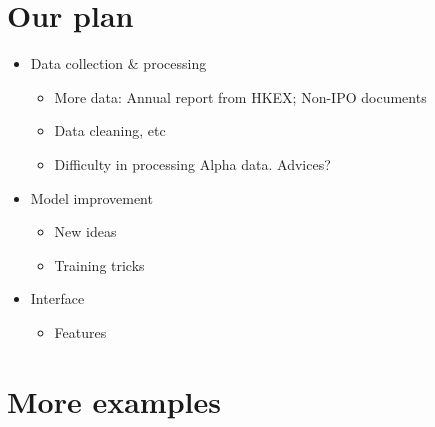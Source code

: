 \documentclass[11pt]{article}
\providecommand{\tightlist}{%
      \setlength{\itemsep}{0pt}\setlength{\parskip}{0pt}}
\begin{document}
    \section{Our plan}\label{our-plan}

\begin{itemize}
\tightlist
\item
  Data collection \& processing

  \begin{itemize}
  \tightlist
  \item
    More data: Annual report from HKEX; Non-IPO documents
  \item
    Data cleaning, etc
  \item
    Difficulty in processing Alpha data. Advices?
  \end{itemize}
\item
  Model improvement

  \begin{itemize}
  \tightlist
  \item
    New ideas
  \item
    Training tricks
  \end{itemize}
\item
  Interface

  \begin{itemize}
  \tightlist
  \item
    Features
  \end{itemize}
\end{itemize}

    \section{More examples}\label{more-examples}
\end{document}
